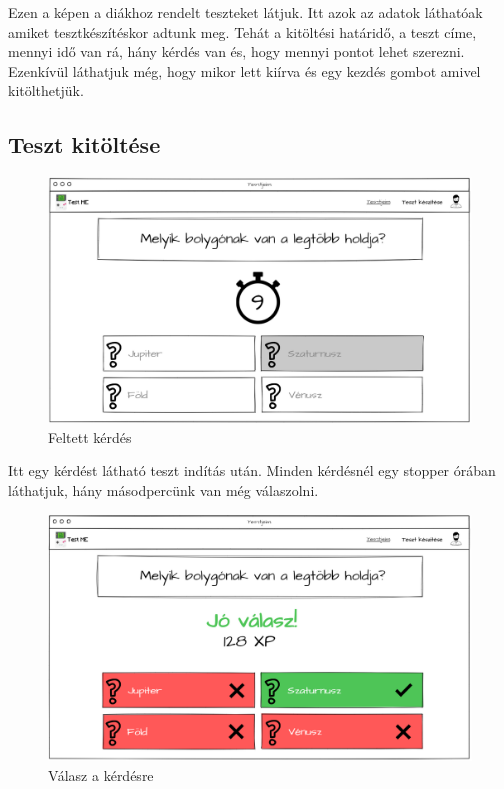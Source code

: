 Ezen a képen  a diákhoz rendelt teszteket látjuk. Itt azok az adatok láthatóak amiket tesztkészítéskor adtunk meg. Tehát a kitöltési határidő, a teszt címe, mennyi idő van rá, hány kérdés van és, hogy mennyi pontot lehet szerezni. Ezenkívül láthatjuk még, hogy mikor lett kiírva és egy kezdés gombot amivel kitölthetjük.

\subsection{Teszt kitöltése}

\begin{figure}[H]
    \centering
    \includegraphics[width=\linewidth]{images/test1_wireframe.png}
    \caption{Feltett kérdés}
    \label{fig:test_question}
\end{figure}

Itt  egy kérdést látható teszt indítás után. Minden kérdésnél egy stopper órában láthatjuk, hány másodpercünk van még válaszolni.

\begin{figure}[H]
    \centering
    \includegraphics[width=\linewidth]{images/test2_wireframe.png}
    \caption{Válasz a kérdésre}
    \label{fig:test_answer}
\end{figure}

